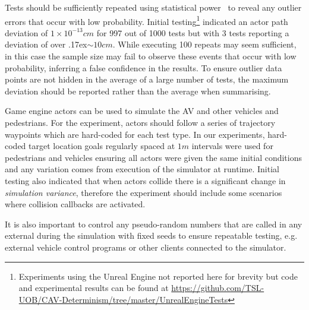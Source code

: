 \documentclass[letterpaper, 10 pt, journal, twoside]{IEEEtran}
\begin{document}
Tests should be sufficiently repeated using statistical power~\cite{cohen2013statistical} to reveal any outlier errors that occur with low probability. Initial testing\footnote{\label{note1}Experiments using the Unreal Engine not reported here for brevity but code and experimental results can be found at \url{https://github.com/TSL-UOB/CAV-Determinism/tree/master/UnrealEngineTests}} indicated an actor path deviation of $1\times10^{-13} cm$ for 997 out of 1000 tests but with 3 tests reporting a deviation of over {\raise.17ex\hbox{$\scriptstyle\sim$}}$10cm$. While executing 100 repeats may seem sufficient, in this case the sample size may fail to observe these events that occur with low probability, inferring a false confidence in the results. To ensure outlier data points are not hidden in the average of a large number of tests, the maximum deviation should be reported rather than the average when summarising.

Game engine actors can be used to simulate the AV and other vehicles and pedestrians. For the experiment, actors should follow a series of trajectory waypoints which are hard-coded for each test type. In our experiments, hard-coded target location goals regularly spaced at $1m$ intervals were used for pedestrians and vehicles ensuring all actors were given the same initial conditions and any variation comes from execution of the simulator at runtime. Initial testing also indicated that when actors collide there is a significant change in \textit{simulation variance}, therefore the experiment should include some scenarios where collision callbacks are activated. 

It is also important to control any pseudo-random numbers that are called in any external during the simulation with fixed seeds to ensure repeatable testing, e.g. external vehicle control programs or other clients connected to the simulator. 



\end{document}
